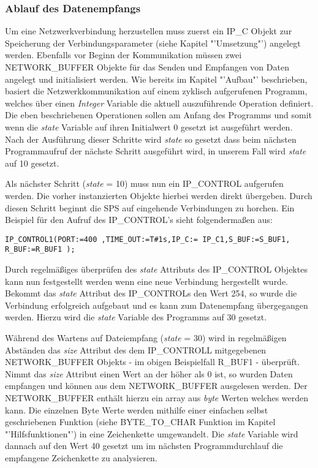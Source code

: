 \subsubsection{Ablauf des Datenempfangs}

Um eine Netzwerkverbindung herzustellen muss zuerst ein IP\_C Objekt zur Speicherung der Verbindungsparameter (siehe Kapitel "'Umsetzung"') angelegt werden.
Ebenfalls vor Beginn der Kommunikation müssen zwei NETWORK\_BUFFER Objekte für das Senden und Empfangen von Daten angelegt und initialisiert werden. 
Wie bereits im Kapitel "'Aufbau"' beschrieben, basiert die Netzwerkkommunikation auf einem zyklisch aufgerufenen Programm, welches über einen \textit{Integer} Variable die aktuell auszuführende Operation definiert. Die eben beschriebenen Operationen sollen am Anfang des Programms und somit wenn die \textit {state} Variable auf ihren Initialwert 0 gesetzt ist ausgeführt werden. Nach der Ausführung dieser Schritte wird \textit {state} so gesetzt dass beim nächsten Programmaufruf der nächste Schritt ausgeführt wird, in unserem Fall wird \textit{state} auf 10 gesetzt.

Als nächster Schritt (\textit{state} = 10) muss nun ein  IP\_CONTROL aufgerufen werden. Die vorher instanzierten Objekte hierbei werden direkt übergeben. Durch diesen Schritt beginnt die SPS auf eingehende Verbindungen zu horchen.
Ein Beispiel für den Aufruf des IP\_CONTROL's sieht folgendermaßen aus:
\begin{lstlisting}[language = codesysls, captionpos=b, caption={Aufruf von IP\_CONTROL}]
IP_CONTROL1(PORT:=400 ,TIME_OUT:=T#1s,IP_C:= IP_C1,S_BUF:=S_BUF1, R_BUF:=R_BUF1 );
\end{lstlisting}
Durch regelmäßiges überprüfen des \textit{state} Attributs des IP\_CONTROL Objektes kann nun festgestellt werden wenn eine neue Verbindung hergestellt wurde. Bekommt das \textit{state} Attribut des IP\_CONTROLs den Wert 254, so wurde die Verbindung erfolgreich aufgebaut und es kann zum Datenempfang übergegangen werden. Hierzu wird die \textit{state} Variable des Programms auf 30 gesetzt.

Während des Wartens auf Dateiempfang (\textit{state} = 30) wird in regelmäßigen Abständen das \textit{size} Attribut des dem IP\_CONTROLL mitgegebenen NETWORK\_BUFFER Objekts - im obigen Beispielfall R\_BUF1 - überprüft. Nimmt das \textit{size} Attribut einen Wert an der höher als 0 ist, so wurden Daten empfangen und können aus dem NETWORK\_BUFFER ausgelesen werden. Der NETWORK\_BUFFER enthält hierzu ein array aus \textit{byte} Werten welches werden kann. Die einzelnen Byte Werte werden mithilfe einer einfachen selbst geschriebenen Funktion (siehe BYTE\_TO\_CHAR Funktion im Kapitel "'Hilfsfunktionen"') in eine Zeichenkette umgewandelt. Die \textit{state} Variable wird dannach auf den Wert 40 gesetzt um im nächsten Programmdurchlauf die empfangene Zeichenkette zu analysieren.


